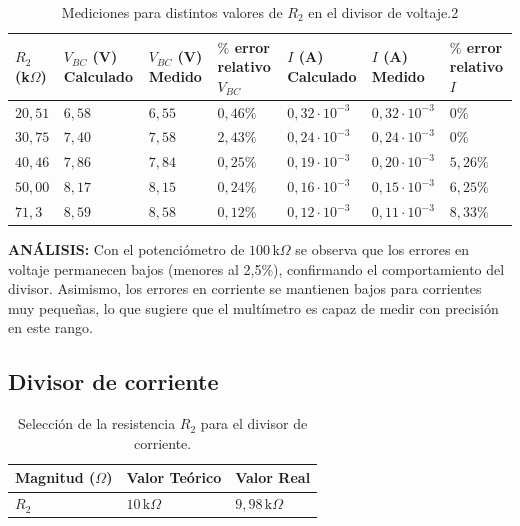 \documentclass[12pt,a4paper]{article}
\begin{document}
\begin{table}[H]
    \centering
    \fontsize{10pt}{12pt}\selectfont
    \renewcommand{\arraystretch}{1.2}
    \setlength{\tabcolsep}{6pt}
    {
    \begin{tabular}{|C{1cm}|C{1.8cm}|C{1.8cm}|C{1.8cm}|C{2cm}|C{1.8cm}|C{2cm}|}
    \hline
    \textbf{$R_2$ (k$\Omega$)} &
    \textbf{$V_{BC}$ (V) Calculado} &
    \textbf{$V_{BC}$ (V) Medido} &
    \textbf{$\%$ error relativo $V_{BC}$} &
    \textbf{$I$ (A) Calculado} &
    \textbf{$I$ (A) Medido} &
    \textbf{$\%$ error relativo $I$} \\
    \hline
    $20,51$ & $6,58$ & $6,55$ & $0,46\%$ & $0,32\cdot10^{-3}$ & $0,32\cdot10^{-3}$ & $0\%$ \\
    \hline
    $30,75$ & $7,40$ & $7,58$ & $2,43\%$ & $0,24\cdot10^{-3}$ & $0,24\cdot10^{-3}$ & $0\%$ \\
    \hline
    $40,46$ & $7,86$ & $7,84$ & $0,25\%$ & $0,19\cdot10^{-3}$ & $0,20\cdot10^{-3}$ & $5,26\%$ \\
    \hline
    $50,00$ & $8,17$ & $8,15$ & $0,24\%$ & $0,16\cdot10^{-3}$ & $0,15\cdot10^{-3}$ & $6,25\%$ \\
    \hline
    $71,3$ & $8,59$ & $8,58$ & $0,12\%$ & $0,12\cdot10^{-3}$ & $0,11\cdot10^{-3}$ & $8,33\%$ \\
    \hline
    \end{tabular}}
\caption{Mediciones para distintos valores de $R_2$ en el divisor de voltaje.2}
\label{tab:divisor-voltaje-potenciometro100k}
\end{table}

\textbf{ANÁLISIS:} Con el potenciómetro de $100\,\mathrm{k}\Omega$ se observa que los errores en voltaje permanecen bajos (menores al 2,5\%), confirmando el comportamiento del divisor. Asimismo, los errores en corriente se mantienen bajos para corrientes muy pequeñas, lo que sugiere que el multímetro es capaz de medir con precisión en este rango.
\bigskip

\subsection{Divisor de corriente}

\begin{table}[H]
    \centering
    \fontsize{10pt}{12pt}\selectfont
    \renewcommand{\arraystretch}{1.2}
    \setlength{\tabcolsep}{6pt}
    {
    \begin{tabular}{|C{3cm}|C{3cm}|C{3cm}|}
    \hline
    \textbf{Magnitud ($\Omega$)} & \textbf{Valor Teórico} & \textbf{Valor Real} \\
    \hline
    $R_2$ & $10\,\mathrm{k}\Omega$ & $9{,}98\,\mathrm{k}\Omega$ \\
    \hline
    \end{tabular}}
\caption{Selección de la resistencia $R_2$ para el divisor de corriente.}
\label{tab:divisor-corriente-r2}
\end{table}
\end{document}
